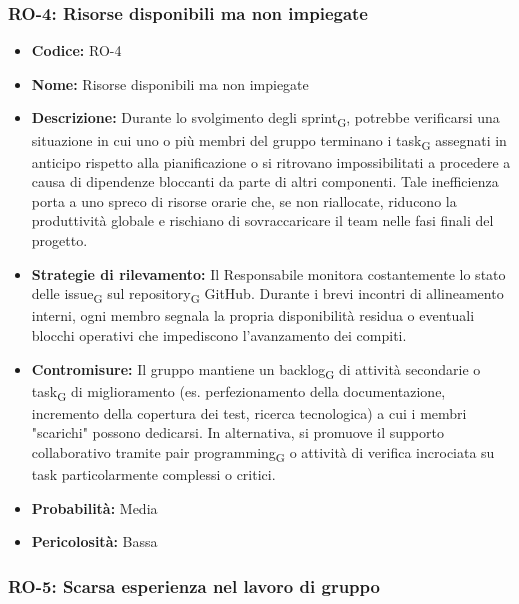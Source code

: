 ﻿\documentclass[a4paper, 10pt, colorlinks=true, linkcolor=black, urlcolor=blue, citecolor=blue, hidelinks]{article}
\begin{document}
\subsubsection{RO-4: Risorse disponibili ma non impiegate}
\begin{itemize}
    \item \textbf{Codice:} RO-4
    \item \textbf{Nome:} Risorse disponibili ma non impiegate

    \item \textbf{Descrizione:} Durante lo svolgimento degli sprint\textsubscript{G}, potrebbe verificarsi una situazione in cui uno o più membri del gruppo terminano i task\textsubscript{G} assegnati in anticipo rispetto alla pianificazione o si ritrovano impossibilitati a procedere a causa di dipendenze bloccanti da parte di altri componenti. Tale inefficienza porta a uno spreco di risorse orarie che, se non riallocate, riducono la produttività globale e rischiano di sovraccaricare il team nelle fasi finali del progetto.

    \item \textbf{Strategie di rilevamento:} Il Responsabile monitora costantemente lo stato delle issue\textsubscript{G} sul repository\textsubscript{G} GitHub. Durante i brevi incontri di allineamento interni, ogni membro segnala la propria disponibilità residua o eventuali blocchi operativi che impediscono l'avanzamento dei compiti.

    \item \textbf{Contromisure:} Il gruppo mantiene un backlog\textsubscript{G} di attività secondarie o task\textsubscript{G} di miglioramento (es. perfezionamento della documentazione, incremento della copertura dei test, ricerca tecnologica) a cui i membri "scarichi" possono dedicarsi. In alternativa, si promuove il supporto collaborativo tramite pair programming\textsubscript{G} o attività di verifica incrociata su task particolarmente complessi o critici.

    \item \textbf{Probabilità:} Media

    \item \textbf{Pericolosità:} Bassa
\end{itemize}

\subsubsection{RO-5: Scarsa esperienza nel lavoro di gruppo}
\end{document}
